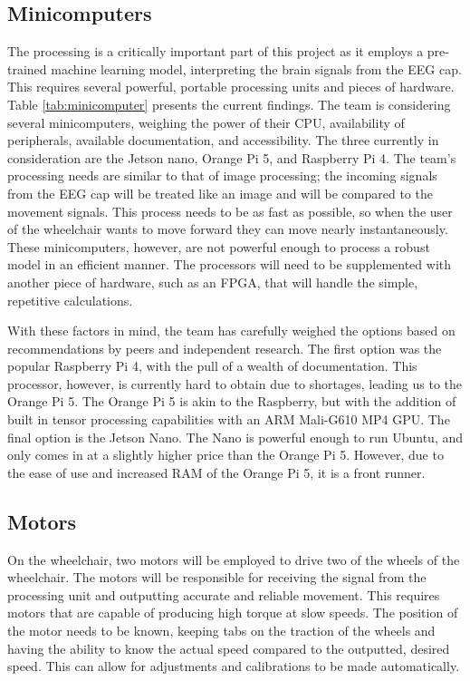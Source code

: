 \documentclass[conference]{IEEEtran}
\begin{document}
        \subsection{Minicomputers}
        The processing is a critically important part of this project as it employs a pre-trained machine learning model, interpreting the brain signals from the EEG cap. This requires several powerful, portable processing units and pieces of hardware. Table \ref{tab:minicomputer} presents the current findings. The team is considering several minicomputers, weighing the power of their CPU, availability of peripherals, available documentation, and accessibility. The three currently in consideration are the Jetson nano, Orange Pi 5, and Raspberry Pi 4. The team's processing needs are similar to that of image processing; the incoming signals from the EEG cap will be treated like an image and will be compared to the movement signals. This process needs to be as fast as possible, so when the user of the wheelchair wants to move forward they can move nearly instantaneously. These minicomputers, however, are not powerful enough to process a robust model in an efficient manner. The processors will need to be supplemented with another piece of hardware, such as an FPGA, that will handle the simple, repetitive calculations. 
        
        With these factors in mind, the team has carefully weighed the options based on recommendations by peers and independent research. The first option was the popular Raspberry Pi 4, with the pull of a wealth of documentation. This processor, however, is currently hard to obtain due to shortages, leading us to the Orange Pi 5. The Orange Pi 5 is akin to the Raspberry, but with the addition of built in tensor processing capabilities with an ARM Mali-G610 MP4 GPU. The final option is the Jetson Nano. The Nano is powerful enough to run Ubuntu, and only comes in at a slightly higher price than the Orange Pi 5. However, due to the ease of use and increased RAM of the Orange Pi 5, it is a front runner.
        
        \subsection{Motors}
        On the wheelchair, two motors will be employed to drive two of the wheels of the wheelchair. The motors will be responsible for receiving the signal from the processing unit and outputting accurate and reliable movement. This requires motors that are capable of producing high torque at slow speeds. The position of the motor needs to be known, keeping tabs on the traction of the wheels and having the ability to know the actual speed compared to the outputted, desired speed. This can allow for adjustments and calibrations to be made automatically. 
        
\end{document}
